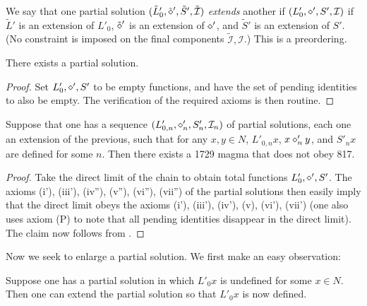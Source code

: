 \begin{definition}
We say that one partial solution $(\tilde L'_0, \tilde {\diamond}', \tilde S', \tilde {\mathcal I})$ \emph{extends} another if $(L'_0, \diamond', S',  {\mathcal I})$ if $\tilde L'$ is an extension of $L'_0$, $\tilde {\diamond}'$ is an extension of $\diamond'$, and $\tilde S'$ is an extension of $S'$.  (No constraint is imposed on the final components $\tilde {\mathcal I}, {\mathcal I}$.)  This is a preordering.
\end{definition}

\begin{lemma}\label{partial-exist}\leanok  There exists a partial solution.
\end{lemma}

\begin{proof}\leanok Set $L'_0, \diamond', S'$ to be empty functions, and have the set of pending identities to also be empty.  The verification of the required axioms is then routine.
\end{proof}

\begin{lemma}\label{chain}\leanok  Suppose that one has a sequence
$(L'_{0,n}, \diamond'_{n}, S'_{n}, {\mathcal I}_n)$ of partial solutions, each one an extension of the previous, such that for any $x, y \in N$, $L'_{0,n} x$, $x \diamond'_{n} y$, and $S'_n x$ are defined for some $n$.  Then there exists a 1729 magma that does not obey 817.
\end{lemma}

\begin{proof}  Take the direct limit of the chain to obtain total functions $L'_0, \diamond', S'$.  The axioms (i'), (iii'), (iv''), (v''), (vi''), (vii'') of the partial solutions then easily imply that the direct limit obeys the axioms (i'), (iii'), (iv'), (v), (vi'), (vii') (one also uses axiom (P) to note that all pending identities disappear in the direct limit). The claim now follows from .
\end{proof}


Now we seek to enlarge a partial solution. We first make an easy observation:

\begin{proposition}[Enlarging $L'_0$]\label{enlarge-l0}\leanok  Suppose one has a partial solution in which $L'_0 x$ is undefined for some $x \in N$.  Then one can extend the partial solution so that $L'_0 x$ is now defined.
\end{proposition}

